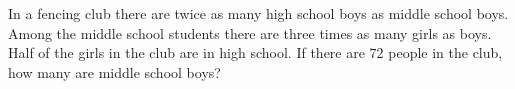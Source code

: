 In a fencing club there are twice as many high school boys as middle school boys. Among the middle school students there are three times as many girls as boys. Half of the girls in the club are in high school. If there are $72$ people in the club, how many are middle school boys?
